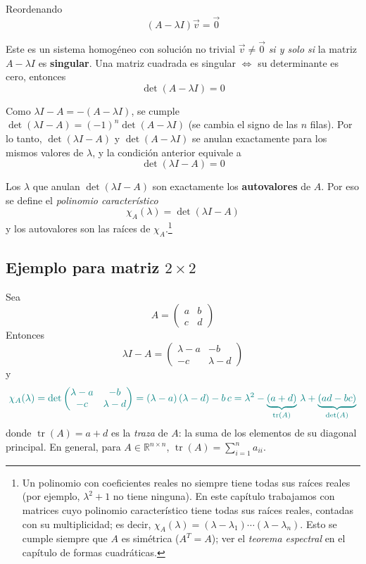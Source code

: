 \documentclass{article}
\newcommand{\vect}[1]{\vec{#1}}
\begin{document}
Reordenando
\[
(A-\lambda I)\vect{v}=\vect{0}
\]

Este es un sistema homogéneo con solución no trivial \(\vect{v}\neq\vect{0}\) \emph{si y solo si} la matriz \(A-\lambda I\) es \textbf{singular}.
Una matriz cuadrada es singular \(\Leftrightarrow\) su determinante es cero, entonces
\[
\det(A-\lambda I)=0
\]

Como \(\lambda I-A=-(A-\lambda I)\), se cumple \(\det(\lambda I-A)=(-1)^n\det(A-\lambda I)\) (se cambia el signo de las \(n\) filas). Por lo tanto, \(\det(\lambda I-A)\) y \(\det(A-\lambda I)\) se anulan exactamente para los mismos valores de \(\lambda\), y la condición anterior equivale a
\[
\det(\lambda I-A)=0
\]

Los \(\lambda\) que anulan \(\det(\lambda I-A)\) son exactamente los \textbf{autovalores} de \(A\).
Por eso se define el \emph{polinomio característico}
\[
\chi_A(\lambda)=\det(\lambda I-A)
\]
y los autovalores son las raíces de \(\chi_A\).\footnote{Un polinomio con coeficientes reales no siempre tiene todas sus raíces reales (por ejemplo, \(\lambda^2+1\) no tiene ninguna). En este capítulo trabajamos con matrices cuyo polinomio característico tiene todas sus raíces reales, contadas con su multiplicidad; es decir, \(\chi_A(\lambda)=(\lambda-\lambda_1)\cdots(\lambda-\lambda_n)\). Esto se cumple siempre que \(A\) es simétrica (\(A^T=A\)); ver el \emph{teorema espectral} en el capítulo de formas cuadráticas.}

\subsection*{Ejemplo para matriz \(2\times2\)}
Sea
\[
A = \begin{pmatrix}
 a & b\\
 c & d
\end{pmatrix}
\]
Entonces
\[
\lambda I - A = \begin{pmatrix}
 \lambda - a & -b\\
 -c & \lambda - d
\end{pmatrix}
\]
y
\[\color{teal}
\chi_A(\lambda)
= \det\begin{pmatrix}
 \lambda - a & -b\\
 -c & \lambda - d
\end{pmatrix}
= (\lambda - a)\,(\lambda - d) - b\,c
= \lambda^2-\underbrace{(a+d)}_{\operatorname{tr}(A)}\,\lambda+\underbrace{(ad-bc)}_{\det(A)}
\]
donde \(\operatorname{tr}(A)=a+d\) es la \emph{traza} de \(A\): la suma de los elementos de su diagonal principal. En general, para \(A\in\mathbb{R}^{n\times n}\), \(\operatorname{tr}(A)=\sum_{i=1}^n a_{ii}\).
\end{document}
